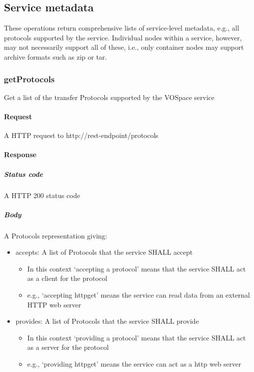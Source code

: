 \documentclass[11pt,a4paper]{ivoa}
\begin{document}
\subsection{Service metadata}
\label{subsec:service metadata}
These operations return comprehensive lists of service-level metadata, e.g., all protocols supported by the service. Individual nodes within a service, however, may not necessarily support all of these, i.e., only container nodes may support archive formats such as zip or tar.

\subsubsection{getProtocols}
\label{subsubsec:getprotocols}
Get a list of the transfer Protocols supported by the VOSpace service

\paragraph{Request}
A HTTP request to http://rest-endpoint/protocols

\paragraph{Response}
\subparagraph{Status code} A HTTP 200 status code
\subparagraph{Body}
A Protocols representation giving:
\begin{itemize}
    \item accepts: A list of Protocols that the service SHALL accept
    \begin{itemize}
        \item In this context `accepting a protocol' means that the service SHALL act as a client for the protocol
        \item e.g., `accepting httpget' means the service can read data from an external HTTP web server
    \end{itemize}
    \item provides: A list of Protocols that the service SHALL provide
    \begin{itemize}
        \item In this context `providing a protocol' means that the service SHALL act as a server for the protocol
        \item e.g., `providing httpget' means the service can act as a http web server
    \end{itemize}
\end{itemize}
\end{document}

